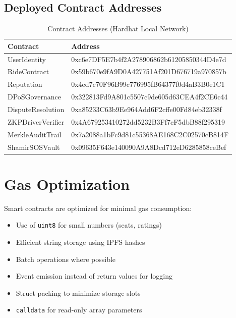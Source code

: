 \documentclass[12pt]{report}
\theoremstyle{plain}
\theoremstyle{definition}
\theoremstyle{remark}
\begin{document}
\subsection{Deployed Contract Addresses}

\begin{table}[H]
\centering
\caption{Contract Addresses (Hardhat Local Network)}
\begin{tabular}{|l|l|}
\hline
\textbf{Contract} & \textbf{Address} \\
\hline
UserIdentity & 0xc6e7DF5E7b4f2A278906862b61205850344D4e7d \\
RideContract & 0x59b670e9fA9D0A427751Af201D676719a970857b \\
Reputation & 0x4ed7c70F96B99c776995fB64377f0d4aB3B0e1C1 \\
DPoSGovernance & 0x322813Fd9A801c5507c9de605d63CEA4f2CE6c44 \\
DisputeResolution & 0xa85233C63b9Ee964Add6F2cffe00Fd84eb32338f \\
ZKPDriverVerifier & 0x4A679253410272dd5232B3Ff7cF5dbB88f295319 \\
MerkleAuditTrail & 0x7a2088a1bFc9d81c55368AE168C2C02570cB814F \\
ShamirSOSVault & 0x09635F643e140090A9A8Dcd712eD6285858ceBef \\
\hline
\end{tabular}
\end{table}

\section{Gas Optimization}

Smart contracts are optimized for minimal gas consumption:

\begin{itemize}
    \item Use of \texttt{uint8} for small numbers (seats, ratings)
    \item Efficient string storage using IPFS hashes
    \item Batch operations where possible
    \item Event emission instead of return values for logging
    \item Struct packing to minimize storage slots
    \item \texttt{calldata} for read-only array parameters
\end{itemize}
\end{document}
